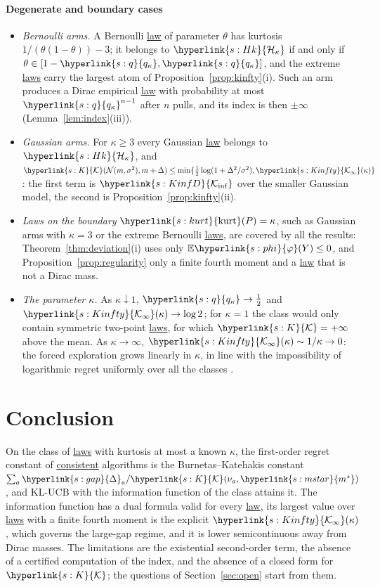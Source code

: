 \documentclass[11pt]{article}
\newcommand{\E}{\mathbb{E}}
\newcommand{\sy}[2]{{\hyperlink{#1}{#2}}}
\newcommand{\term}[2]{\hyperlink{#1}{#2}}
\newcommand{\kurt}{\sy{s:kurt}{\mathrm{kurt}}}
\newcommand{\mstar}{\sy{s:mstar}{m^{\star}}}
\newcommand{\gap}{\sy{s:gap}{\Delta}}
\newcommand{\Kinf}{\sy{s:KinfD}{\mathcal{K}_{\inf}}}
\newcommand{\Hk}{\sy{s:Hk}{\mathcal{H}_{\kappa}}}
\newcommand{\Kc}{\sy{s:K}{\mathcal{K}}}
\newcommand{\phik}{\sy{s:phi}{\varphi}}
\newcommand{\qk}{\sy{s:q}{q_{\kappa}}}
\newcommand{\Kinfty}{\sy{s:Kinfty}{\mathcal{K}_{\infty}}}
\begin{document}
\paragraph{Degenerate and boundary cases}
\begin{itemize}
  \item \emph{Bernoulli arms.} A Bernoulli \term{w:law}{law} of parameter $\theta$ has kurtosis $1/(\theta(1-\theta))-3$; it belongs to $\Hk$ if and
  only if $\theta\in[1-\qk,\qk]$, and the extreme \term{w:law}{laws} carry the largest atom of Proposition~\ref{prop:kinfty}(i). Such an arm
  produces a Dirac empirical \term{w:law}{law} with probability at most $\qk^{n-1}$ after $n$ pulls, and its index is then $\pm\infty$
  (Lemma~\ref{lem:index}(iii)).
  \item \emph{Gaussian arms.} For $\kappa\ge3$ every Gaussian \term{w:law}{law} belongs to $\Hk$, and
  $\Kc(\mathcal N(m,\sigma^2),m+\Delta)\le\min\{\frac12\log(1+\Delta^2/\sigma^2),\Kinfty(\kappa)\}$: the first term is $\Kinf$ over the smaller
  Gaussian model, the second is Proposition~\ref{prop:kinfty}(ii).
  \item \emph{Laws on the boundary} $\kurt(P)=\kappa$, such as Gaussian arms with $\kappa=3$ or the extreme Bernoulli \term{w:law}{laws}, are
  covered by all the results: Theorem~\ref{thm:deviation}(i) uses only $\E\phik(Y)\le0$, and
  Proposition~\ref{prop:regularity} only a finite fourth moment and a \term{w:law}{law} that is not a Dirac mass.
  \item \emph{The parameter $\kappa$.} As $\kappa\downarrow1$, $\qk\to\frac12$ and $\Kinfty(\kappa)\to\log2$; for $\kappa=1$ the class would only
  contain symmetric two-point \term{w:law}{laws}, for which $\Kc=+\infty$ above the mean. As $\kappa\to\infty$, $\Kinfty(\kappa)\sim1/\kappa\to0$: the forced
  exploration grows linearly in $\kappa$, in line with the impossibility of logarithmic regret uniformly over all the
  classes \citep[Theorem~7]{L17}.
\end{itemize}

\section{Conclusion}\label{sec:conclusion}

On the class of \term{w:law}{laws} with kurtosis at most a known $\kappa$, the first-order regret constant of \term{w:consistent}{consistent} algorithms
is the Burnetas--Katehakis constant $\sum_a\gap_a/\Kc(\nu_a,\mstar)$, and KL-UCB with the information function of the
class attains it. The information function has a dual formula valid for every \term{w:law}{law}, its largest value over
\term{w:law}{laws} with a finite fourth moment is the explicit $\Kinfty(\kappa)$, which governs the large-gap regime, and it is lower semicontinuous away from Dirac
masses. The limitations are the existential second-order term, the absence of a certified computation of the
index, and the absence of a closed form for $\Kc$; the questions of Section~\ref{sec:open} start from them.
\end{document}
